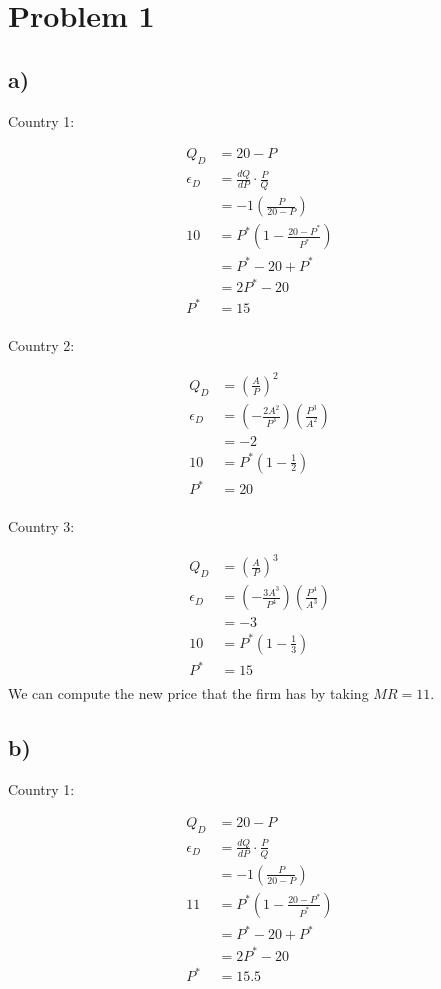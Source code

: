 \documentclass[12pt,letterpaper]{article}
\theoremstyle{definition}
\begin{document}
\section*{Problem 1}

\subsection*{a)}

Country 1:

\begin{align*}
  Q_D &= 20 - P \\
  \epsilon_D &= \frac{dQ}{dP} \cdot \frac{P}{Q} \\
      &= -1(\frac{P}{20 - P}) \\
  10 &= P^*(1 - \frac{20 - P^*}{P^*}) \\
      &= P^* - 20 + P^* \\
      &= 2P^* - 20 \\
  P^* &= 15 \\
\end{align*}


Country 2:

\begin{align*}
  Q_D &= (\frac{A}{P})^2 \\
  \epsilon_D &= (-\frac{2A^2}{P^3})(\frac{P^3}{A^2}) \\
      &= -2 \\
  10 &= P^*(1 - \frac{1}{2}) \\
  P^* &= 20 \\
\end{align*}

Country 3:

\begin{align*}
  Q_D &= (\frac{A}{P})^3 \\
  \epsilon_D &= (-\frac{3A^3}{P^4})(\frac{P^4}{A^3}) \\
      &= -3 \\
  10 &= P^*(1 - \frac{1}{3}) \\
  P^* &= 15 \\
\end{align*}
We can compute the new price that the firm has by taking $MR = 11$.

\subsection*{b)}

Country 1:

\begin{align*}
  Q_D &= 20 - P \\
  \epsilon_D &= \frac{dQ}{dP} \cdot \frac{P}{Q} \\
      &= -1(\frac{P}{20 - P}) \\
  11 &= P^*(1 - \frac{20 - P^*}{P^*}) \\
      &= P^* - 20 + P^* \\
      &= 2P^* - 20 \\
  P^* &= 15.5 \\
\end{align*}
\end{document}

